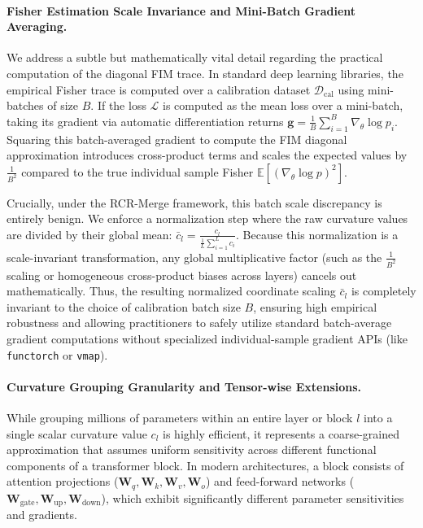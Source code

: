 \paragraph{Fisher Estimation Scale Invariance and Mini-Batch Gradient Averaging.}
We address a subtle but mathematically vital detail regarding the practical computation of the diagonal FIM trace. In standard deep learning libraries, the empirical Fisher trace is computed over a calibration dataset $\mathcal{D}_{\text{cal}}$ using mini-batches of size $B$. If the loss $\mathcal{L}$ is computed as the mean loss over a mini-batch, taking its gradient via automatic differentiation returns $\mathbf{g} = \frac{1}{B} \sum_{i=1}^B \nabla_\theta \log p_i$. Squaring this batch-averaged gradient to compute the FIM diagonal approximation introduces cross-product terms and scales the expected values by $\frac{1}{B^2}$ compared to the true individual sample Fisher $\mathbb{E} [ (\nabla_\theta \log p)^2 ]$. 

Crucially, under the RCR-Merge framework, this batch scale discrepancy is entirely benign. We enforce a normalization step where the raw curvature values are divided by their global mean: $\bar{c}_l = \frac{c_l}{\frac{1}{L} \sum_{i=1}^L c_i}$. Because this normalization is a scale-invariant transformation, any global multiplicative factor (such as the $\frac{1}{B^2}$ scaling or homogeneous cross-product biases across layers) cancels out mathematically. Thus, the resulting normalized coordinate scaling $\bar{c}_l$ is completely invariant to the choice of calibration batch size $B$, ensuring high empirical robustness and allowing practitioners to safely utilize standard batch-average gradient computations without specialized individual-sample gradient APIs (like \texttt{functorch} or \texttt{vmap}).

\paragraph{Curvature Grouping Granularity and Tensor-wise Extensions.}
While grouping millions of parameters within an entire layer or block $l$ into a single scalar curvature value $c_l$ is highly efficient, it represents a coarse-grained approximation that assumes uniform sensitivity across different functional components of a transformer block. In modern architectures, a block consists of attention projections ($\mathbf{W}_q, \mathbf{W}_k, \mathbf{W}_v, \mathbf{W}_o$) and feed-forward networks ($\mathbf{W}_{\text{gate}}, \mathbf{W}_{\text{up}}, \mathbf{W}_{\text{down}}$), which exhibit significantly different parameter sensitivities and gradients.

